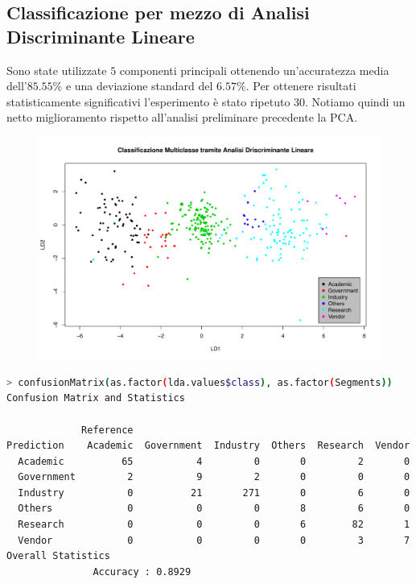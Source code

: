 \documentclass[11pt,a4paper]{article}
\begin{document}
\subsection{Classificazione per mezzo di Analisi Discriminante Lineare}
Sono state utilizzate $5$ componenti principali ottenendo un'accuratezza media
dell'$85.55\%$ e una deviazione standard del $6.57\%$. Per ottenere risultati
statisticamente significativi l'esperimento \`e stato ripetuto $30$. Notiamo
quindi un netto miglioramento rispetto all'analisi preliminare precedente la
PCA.
\begin{figure}[H]
	\vspace{-2.5cm}
	\hspace{-0.8cm}
	\includegraphics[scale=.59]{imgs/LDA_plot.pdf}
\end{figure}
\vspace{-0.6cm}
\begin{lstlisting}[language=bash,basicstyle=\scriptsize,tabsize=2,frame = single]
> confusionMatrix(as.factor(lda.values$class), as.factor(Segments))
Confusion Matrix and Statistics

             Reference
Prediction    Academic  Government  Industry  Others  Research  Vendor
  Academic          65           4         0       0         2       0
  Government         2           9         2       0         0       0
  Industry           0          21       271       0         6       0
  Others             0           0         0       8         6       0
  Research           0           0         0       6        82       1
  Vendor             0           0         0       0         3       7
Overall Statistics
               Accuracy : 0.8929          
\end{lstlisting}
\end{document}
